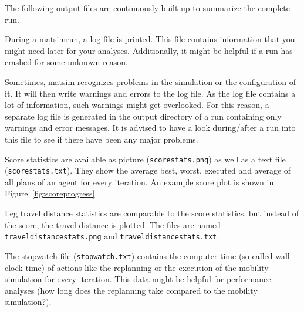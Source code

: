 The following output files are continuously built up to summarize the complete run.
\begin{description}\styleDescription

  \item[Log File:]
During a \gls{matsimrun}, a log file is printed. This file contains information that you might need later for your analyses. Additionally, it might be helpful if a run has crashed for some unknown reason. 

\item[Warnings and Errors Log File:]
Sometimes, \gls{matsim} recognizes problems in the simulation or the configuration of it. It will then write warnings and errors to the log file. As the log file contains a lot of information, such warnings might get overlooked. For this reason, a separate log file is generated in the output directory of a run containing only warnings and error messages. It is advised to have a look during/after a run into this file to see if there have been any major problems.

\item[Score Statistics:]
Score statistics are available as picture (\lstinline|scorestats.png|) as well as a text file (\lstinline|scorestats.txt|). They show the average best, worst, executed and average of all plans of an agent for every iteration. An example score plot is shown in Figure~\ref{fig:scoreprogress}.

\item[Leg Travel Distance Statistics:]
Leg travel distance statistics are comparable to the score statistics, but instead of the score, the travel distance is plotted. The files are named \lstinline|traveldistancestats.png| and \lstinline|traveldistancestats.txt|.

\item[Stopwatch:]
The stopwatch file (\lstinline|stopwatch.txt|) contains the computer time (so-called wall clock time) of actions like the replanning or the execution of the mobility simulation for every iteration. This data might be helpful for performance analyses (\eg how long does the replanning take compared to the mobility simulation?).

\end{description}


